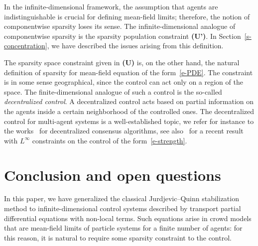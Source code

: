 \documentclass{article}
\theoremstyle{definition}\newtheorem{remark}{Remark}
\begin{document}
In the infinite-dimensional framework, the assumption that agents are indistinguishable is crucial for defining mean-field limits; therefore, the notion of componentwise sparsity loses its sense. The infinite-dimensional analogue of componentwise sparsity is the sparsity population constraint {\bf (U')}. 
In Section~\ref{s-concentration}, we have described the issues arising from this definition.

The sparsity space constraint given in {\bf (U)} is, on the other hand, the natural definition of sparsity for mean-field equation of the form~\eqref{e-PDE}. The constraint is in some sense geographical, since the control can act only on a region of the space. 
The finite-dimensional analogue of such a control is the so-called \emph{decentralized control}. A decentralized control acts based on partial information on the agents inside a certain neighborhood of the controlled ones. The decentralized control for multi-agent systems is a well-established topic, we refer for instance to the works~\cite{dGJ,TJP07,ZJP07} for decentralized consensus algorithms, see also~\cite{BFK15} for a recent result 
with $L^\infty$ constraints on the control of the form~\eqref{e-strength}.








\section{Conclusion and open questions}
In this paper, we have generalized the classical Jurdjevic--Quinn stabilization method to infinite-dimensional control systems described by transport partial differential equations with non-local terms. Such equations arise in crowd models that are mean-field limits of particle systems for a finite number of agents: for this reason, it is natural to require some sparsity constraint to the control.
\end{document}
